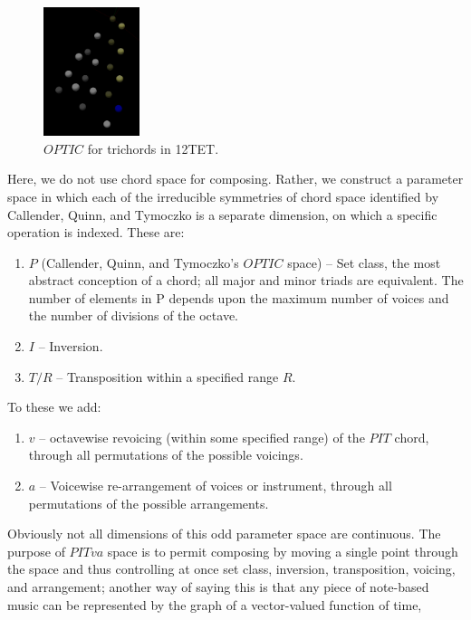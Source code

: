 \documentclass[english,11pt,letterpaper,onecolumn]{scrartcl}
\numberwithin{equation}{section}
\begin{document}
\begin{figure}
\centerline{\includegraphics[width = 0.25\textwidth]{opttic}}
\caption{\label{fig:optic}
  $OPTIC$ for trichords in 12TET.}
\end{figure}

Here, we do not use chord space for composing. Rather, we construct a parameter
space in which each of the irreducible symmetries of chord space identified by
Callender, Quinn, and Tymoczko is a separate dimension, on which a specific
operation is indexed. These are:

\begin{enumerate}
\item $P$ (Callender, Quinn, and Tymoczko's $OPTIC$ space) -- Set class, the
most abstract conception of a chord; all major and minor triads are equivalent.
The number of elements in P depends upon the maximum number of voices and the
number of divisions of the octave.
\item $I$ -- Inversion.
\item $T/R$ -- Transposition within a specified range $R$.
\end{enumerate}

\noindent To these we add:

\begin{enumerate}[resume]
\item $v$ -- octavewise revoicing (within some specified range) of the $PIT$
chord, through all permutations of the possible voicings.
\item $a$ -- Voicewise re-arrangement of voices or instrument, through all
permutations of the possible arrangements.
\end{enumerate}

\noindent Obviously not all dimensions of this odd parameter space are
continuous. The purpose of $PITva$ space is to permit composing by moving a
single point through the space and thus controlling at once set class,
inversion, transposition, voicing, and arrangement; another way of saying this
is that any piece of note-based music can be represented by the graph of a
vector-valued function of time,
\end{document}
